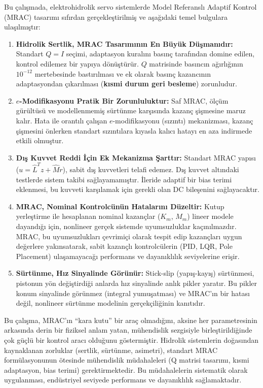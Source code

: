 \documentclass[12pt,a4paper]{article}
\begin{document}
Bu çalışmada, elektrohidrolik servo sistemlerde Model Referanslı Adaptif Kontrol (MRAC) tasarımı sıfırdan gerçekleştirilmiş ve aşağıdaki temel bulgulara ulaşılmıştır:

\begin{enumerate}
    \item \textbf{Hidrolik Sertlik, MRAC Tasarımının En Büyük Düşmanıdır:} Standart $Q = I$ seçimi, adaptasyon kuralını basınç tarafından domine edilen, kontrol edilemez bir yapıya dönüştürür. $Q$ matrisinde basıncın ağırlığının $10^{-12}$ mertebesinde bastırılması ve ek olarak basınç kazancının adaptasyondan çıkarılması (\textbf{kısmi durum geri besleme}) zorunludur.

    \item \textbf{$e$-Modifikasyonu Pratik Bir Zorunluluktur:} Saf MRAC, ölçüm gürültüsü ve modellenmemiş sürtünme karşısında kazanç şişmesine maruz kalır. Hata ile orantılı çalışan $e$-modifikasyonu (sızıntı) mekanizması, kazanç şişmesini önlerken standart sızıntılara kıyasla kalıcı hatayı en aza indirmede etkili olmuştur.

    \item \textbf{Dış Kuvvet Reddi İçin Ek Mekanizma Şarttır:} Standart MRAC yapısı ($u = \hat{L}^T z + \hat{M} r$), sabit dış kuvvetleri telafi edemez. Dış kuvvet altındaki testlerde sistem takibi sağlayamamıştır. İleride adaptif bir bias terimi eklenmesi, bu kuvveti karşılamak için gerekli olan DC bileşenini sağlayacaktır.

    \item \textbf{MRAC, Nominal Kontrolcünün Hatalarını Düzeltir:} Kutup yerleştirme ile hesaplanan nominal kazançlar ($K_m$, $M_m$) lineer modele dayandığı için, nonlineer gerçek sistemde uyumsuzluklar kaçınılmazdır. MRAC, bu uyumsuzlukları çevrimiçi olarak tespit edip kazançları uygun değerlere yakınsatarak, sabit kazançlı kontrolcülerin (PID, LQR, Pole Placement) ulaşamayacağı performans ve dayanıklılık seviyelerine erişir.

    \item \textbf{Sürtünme, Hız Sinyalinde Görünür:} Stick-slip (yapış-kayış) sürtünmesi, pistonun yön değiştirdiği anlarda hız sinyalinde anlık pikler yaratır. Bu pikler konum sinyalinde görünmez (integral yumuşatması) ve MRAC'ın bir hatası değil, nonlineer sürtünme modelinin gerçekçiliğinin kanıtıdır.
\end{enumerate}

\begin{kavram}
Bu çalışma, MRAC'ın ``kara kutu'' bir araç olmadığını, aksine her parametresinin arkasında derin bir fiziksel anlam yatan, mühendislik sezgisiyle birleştirildiğinde çok güçlü bir kontrol aracı olduğunu göstermiştir. Hidrolik sistemlerin doğasından kaynaklanan zorluklar (sertlik, sürtünme, asimetri), standart MRAC formülasyonunun ötesinde mühendislik müdahaleleri (Q matrisi tasarımı, kısmi adaptasyon, bias terimi) gerektirmektedir. Bu müdahalelerin sistematik olarak uygulanması, endüstriyel seviyede performans ve dayanıklılık sağlamaktadır.
\end{kavram}
\end{document}
